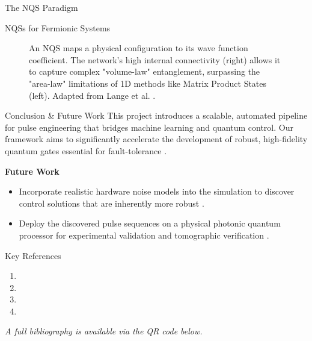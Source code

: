 \documentclass[final]{beamer}
\newlength{\colwidth}
\begin{document}
\begin{frame}[t]
\begin{columns}[t]
\begin{column}{\colwidth}
\begin{block}{The NQS Paradigm}
\begin{exampleblock}{NQSs for Fermionic Systems}
\begin{figure}
      \vspace{24px}
      \caption{ \centering \scriptsize An NQS maps a physical configuration to its wave function coefficient. The network's high internal connectivity (right) allows it to capture complex "volume-law" entanglement, surpassing the "area-law" limitations of 1D methods like Matrix Product States (left). Adapted from Lange et al. \cite{Lange2024Review, Carleo2017Science}.}
    \end{figure}
    \end{exampleblock}
\end{block}

  \begin{block}{Conclusion \& Future Work}
    This project introduces a scalable, automated pipeline for pulse engineering that bridges machine learning and quantum control. Our framework aims to significantly accelerate the development of robust, high-fidelity quantum gates essential for fault-tolerance \cite{Berni2025Proposal}.
    
    \textbf{Future Work}
    \begin{itemize}
      \item Incorporate realistic hardware noise models into the simulation to discover control solutions that are inherently more robust \cite{Berni2025Proposal}.
      \item Deploy the discovered pulse sequences on a physical photonic quantum processor for experimental validation and tomographic verification \cite{Berni2025Proposal}.
    \end{itemize}
  \end{block}
  
  \begin{block}{Key References}
    \vspace{-52px}
    \small
    
    \begin{enumerate}
        \item {}
        \item {}
        \item {}
        \item {}
    \end{enumerate}    
    \centering
    \vspace{12px}
    \textit{A full bibliography is available via the QR code below.}
    

\end{block}
\end{column}
\end{columns}
\end{frame}
\end{document}
